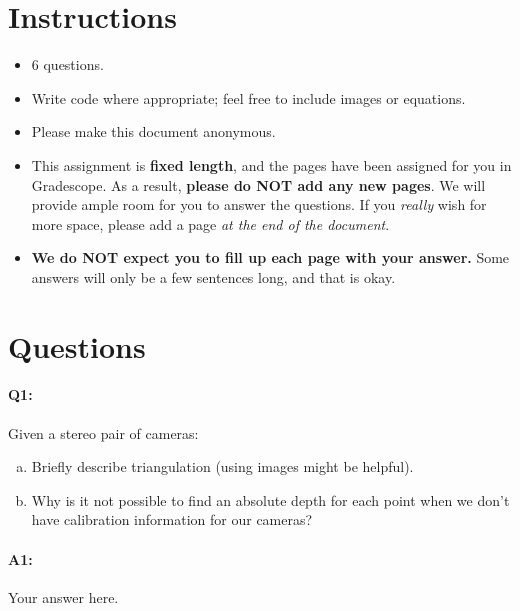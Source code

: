 \maketitle
\vspace{-2cm}
\thispagestyle{fancy}

\section*{Instructions}
\begin{itemize}
  \item 6 questions.
  \item Write code where appropriate; feel free to include images or equations.
  \item Please make this document anonymous.
  \item This assignment is \textbf{fixed length}, and the pages have been assigned for you in Gradescope. As a result, \textbf{please do NOT add any new pages}. We will provide ample room for you to answer the questions. If you \emph{really} wish for more space, please add a page \emph{at the end of the document}.
  \item \textbf{We do NOT expect you to fill up each page with your answer.} Some answers will only be a few sentences long, and that is okay.
\end{itemize}

\section*{Questions}


\paragraph{Q1:} Given a stereo pair of cameras:
\begin{enumerate} [(a)]
\item Briefly describe triangulation (using images might be helpful).
\item Why is it not possible to find an absolute depth for each point when we don't have calibration information for our cameras?
\end{enumerate}

\paragraph{A1:} Your answer here.


